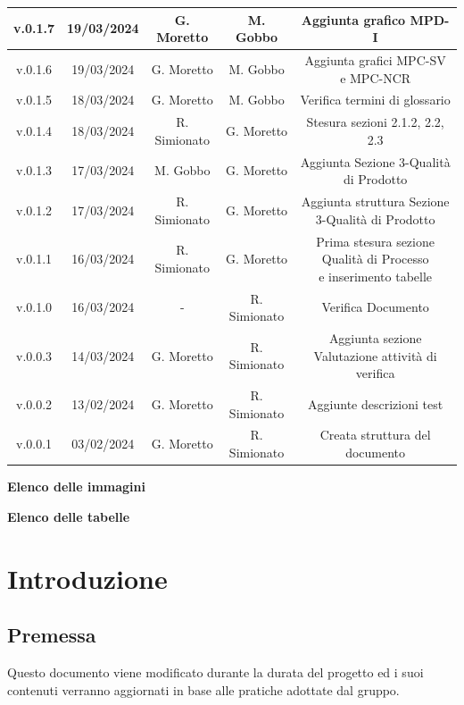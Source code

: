 \documentclass[5pt]{article}
\begin{document}
\begin{table}[H]
{\begin{tabular}{|c|c|c|c|c|}
				\hline
				v.0.1.7 & 19/03/2024 & G. Moretto & M. Gobbo & Aggiunta grafico MPD-I \\
				\hline
				v.0.1.6 & 19/03/2024 & G. Moretto & M. Gobbo & Aggiunta grafici MPC-SV e MPC-NCR \\
				\hline
				v.0.1.5 & 18/03/2024 & G. Moretto & M. Gobbo & Verifica termini di glossario \\
				\hline
				v.0.1.4 & 18/03/2024 & R. Simionato & G. Moretto & Stesura sezioni 2.1.2, 2.2, 2.3 \\
				\hline
				v.0.1.3 & 17/03/2024 & M. Gobbo & G. Moretto & Aggiunta Sezione 3-Qualità di Prodotto \\
				\hline
				v.0.1.2 & 17/03/2024 & R. Simionato & G. Moretto & Aggiunta struttura Sezione 3-Qualità di Prodotto \\
				\hline
				v.0.1.1 & 16/03/2024 & R. Simionato & G. Moretto & \shortstack{Prima stesura sezione Qualità di Processo\\e inserimento tabelle} \\
				\hline
				v.0.1.0 & 16/03/2024 & - & R. Simionato & Verifica Documento \\
				\hline
				v.0.0.3 & 14/03/2024 & G. Moretto & R. Simionato & Aggiunta sezione Valutazione attività di verifica \\
				\hline
				v.0.0.2 & 13/02/2024 & G. Moretto & R. Simionato  &  Aggiunte descrizioni test\\
				\hline
				v.0.0.1 & 03/02/2024 & G. Moretto & R. Simionato  & Creata struttura del documento \\
				\hline
	   		\end{tabular}
		}
	 	\label{tab:conference}
    \end{table}

	\pagebreak
	\tableofcontents
	\pagebreak

	\textbf{\Large Elenco delle immagini} \\
	\makeatletter
	\makeatother
	
	\pagebreak
	\textbf{\Large Elenco delle tabelle} \\
	\makeatletter
	\makeatother
	
	\pagebreak
	
	\section{Introduzione}
	
	\subsection{Premessa}
	Questo documento viene modificato durante la durata del progetto ed i suoi contenuti verranno aggiornati in base alle pratiche adottate dal gruppo.
	
\end{document}
